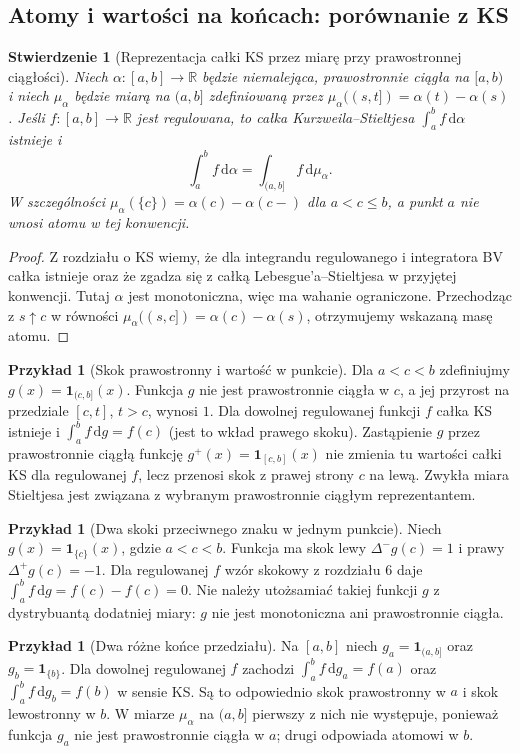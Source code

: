 \documentclass[11pt,a4paper]{article}
\numberwithin{equation}{section}
\theoremstyle{plain}
\newtheorem{stwierdzenie}[twierdzenie]{Stwierdzenie}
\theoremstyle{definition}
\newtheorem{przyklad}[twierdzenie]{Przykład}
\theoremstyle{remark}
\newcommand{\R}{\mathbb R}
\newcommand{\ind}[1]{\mathbf 1_{#1}}
\begin{document}
\subsection*{Atomy i wartości na końcach: porównanie z KS}
\begin{stwierdzenie}[Reprezentacja całki KS przez miarę przy prawostronnej ciągłości]\label{st:ks-miara-konwencja}
Niech $\alpha:[a,b]\to\R$ będzie niemalejąca, prawostronnie ciągła na $[a,b)$ i niech $\mu_\alpha$ będzie miarą na $(a,b]$ zdefiniowaną przez $\mu_\alpha((s,t])=\alpha(t)-\alpha(s)$. Jeśli $f:[a,b]\to\R$ jest regulowana, to całka Kurzweila--Stieltjesa $\int_a^b f\,\mathrm d\alpha$ istnieje i
\[
\int_a^b f\,\mathrm d\alpha=\int_{(a,b]}f\,\mathrm d\mu_\alpha.
\]
W szczególności $\mu_\alpha(\{c\})=\alpha(c)-\alpha(c-)$ dla $a<c\le b$, a punkt $a$ nie wnosi atomu w tej konwencji.
\end{stwierdzenie}
\begin{proof}
Z rozdziału o KS wiemy, że dla integrandu regulowanego i integratora BV całka istnieje oraz że zgadza się z całką Lebesgue'a--Stieltjesa w przyjętej konwencji. Tutaj $\alpha$ jest monotoniczna, więc ma wahanie ograniczone. Przechodząc z $s\uparrow c$ w równości $\mu_\alpha((s,c])=\alpha(c)-\alpha(s)$, otrzymujemy wskazaną masę atomu.
\end{proof}
\begin{przyklad}[Skok prawostronny i wartość w punkcie]
Dla $a<c<b$ zdefiniujmy $g(x)=\ind{(c,b]}(x)$. Funkcja $g$ nie jest prawostronnie ciągła w $c$, a jej przyrost na przedziale $[c,t]$, $t>c$, wynosi $1$. Dla dowolnej regulowanej funkcji $f$ całka KS istnieje i $\int_a^b f\,\mathrm dg=f(c)$ (jest to wkład prawego skoku). Zastąpienie $g$ przez prawostronnie ciągłą funkcję $g^+(x)=\ind{[c,b]}(x)$ nie zmienia tu wartości całki KS dla regulowanej $f$, lecz przenosi skok z prawej strony $c$ na lewą. Zwykła miara Stieltjesa jest związana z wybranym prawostronnie ciągłym reprezentantem.
\end{przyklad}
\begin{przyklad}[Dwa skoki przeciwnego znaku w jednym punkcie]
Niech $g(x)=\ind{\{c\}}(x)$, gdzie $a<c<b$. Funkcja ma skok lewy $\Delta^-g(c)=1$ i prawy $\Delta^+g(c)=-1$. Dla regulowanej $f$ wzór skokowy z rozdziału 6 daje $\int_a^b f\,\mathrm dg=f(c)-f(c)=0$. Nie należy utożsamiać takiej funkcji $g$ z dystrybuantą dodatniej miary: $g$ nie jest monotoniczna ani prawostronnie ciągła.
\end{przyklad}
\begin{przyklad}[Dwa różne końce przedziału]
Na $[a,b]$ niech $g_a=\ind{(a,b]}$ oraz $g_b=\ind{\{b\}}$. Dla dowolnej regulowanej $f$ zachodzi
$\int_a^b f\,\mathrm dg_a=f(a)$ oraz $\int_a^b f\,\mathrm dg_b=f(b)$ w sensie KS. Są to odpowiednio skok prawostronny w $a$ i skok lewostronny w $b$. W miarze $\mu_\alpha$ na $(a,b]$ pierwszy z nich nie występuje, ponieważ funkcja $g_a$ nie jest prawostronnie ciągła w $a$; drugi odpowiada atomowi w $b$.
\end{przyklad}
\end{document}
